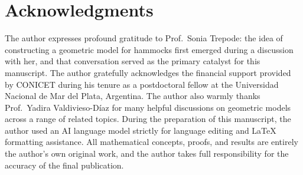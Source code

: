 \documentclass[11pt,a4paper,reqno]{amsart}
\theoremstyle{definition}
\theoremstyle{remark}
\begin{document}
\vspace{0.5em}
\section*{Acknowledgments}

The author expresses profound gratitude to Prof.\ Sonia Trepode: the idea of constructing a geometric model for hammocks first emerged during a discussion with her, and that conversation served as the primary catalyst for this manuscript. The author gratefully acknowledges the financial support provided by CONICET during his tenure as a postdoctoral fellow at the Universidad Nacional de Mar del Plata, Argentina. The author also warmly thanks Prof.\ Yadira Valdivieso-D\'iaz for many helpful discussions on geometric models across a range of related topics. During the preparation of this manuscript, the author used an AI language model strictly for language editing and LaTeX formatting assistance. All mathematical concepts, proofs, and results are entirely the author's own original work, and the author takes full responsibility for the accuracy of the final publication. 
\end{document}
